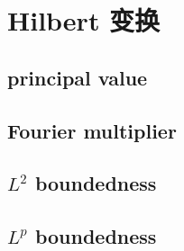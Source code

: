 \section{Hilbert 变换}
\label{b2:sec:1801}


\subsection{principal value}
\label{b2:subsec:180101}

\subsection{Fourier multiplier}
\label{b2:subsec:180102}

\subsection{\texorpdfstring{\(L^2\)}{L2} boundedness}
\label{b2:subsec:180103}

\subsection{\texorpdfstring{\(L^p\)}{Lp} boundedness}
\label{b2:subsec:180104}


